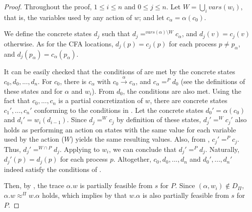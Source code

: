 \documentclass[numbook]{svjour3}
\begin{document}
\begin{proof}
	Throughout the proof, $1 \le i \le n$ and $0 \le j \le n$. Let $W = \bigcup_i {vars}(w_i)$, that is, the variables used by any action of $w$; and let $c_\alpha = \alpha(c_0)$.
	
	We define the concrete states $d_j$ such that $d_j =^{{vars}(\alpha) \setminus W} c_\alpha$, and $d_j(v) = c_j(v)$ otherwise. As for the CFA locations, $d_j(p) = c_j(p)$ for each process $p \ne p_\alpha$, and $d_j(p_\alpha) = c_\alpha(p_\alpha)$.

	It can be easily checked that the conditions of  are met by the concrete states $c_0, d_0, ..., d_n$. For $c_0$, there is $c_\alpha$ with $c_0 \xrightarrow{\alpha} c_\alpha$, and $c_\alpha =^P d_0$ (see the definitions of these states and  for $\alpha$ and $w_i$). From $d_0$, the conditions are also met. Using the fact that $c_0, ..., c_n$ is a partial concretization of $w$, there are concrete states $c_1', ..., c_n'$ conforming to the conditions in . Let the concrete states $d_0' = \alpha(c_0)$ and $d_i' = w_i(d_{i-1})$. Since $d_j =^W c_j$ by definition of these states, $d_j' =^W c_j'$ also holds as performing an action on states with the same value for each variable used by the action ($W$) yields the same resulting values. Also, from , $c_j' =^P c_j$. Thus, $d_j' =^{W \cap P} d_j$. Applying  to $w_i$, we can conclude that $d_j' =^P d_j$. Naturally, $d_j'(p) = d_j(p)$ for each process $p$. Altogether, $c_0, d_0, ..., d_n$ and $d_0', ..., d_n'$ indeed satisfy the conditions of .
	
	Then, by , the trace $\alpha.w$ is partially feasible from $s$ for $P$. Since $(\alpha, w_i) \notin D_\Pi$, $\alpha.w \approx^\Pi w.\alpha$ holds, which implies by  that $w.\alpha$ is also partially feasible from $s$ for $P$.
\end{proof}
\end{document}
